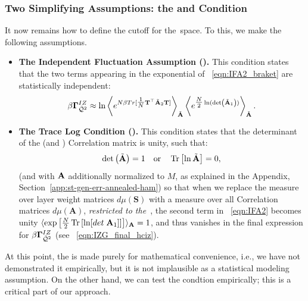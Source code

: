 \subsubsection{Two Simplifying Assumptions: the \IFA and \TRACELOG Condition}
\label{sxn:matgen_quality_hciz_C}

It now remains how to define the cutoff for the~\ECS space. To this, we make the following assumptions.
\begin{itemize}
\item
\textbf{The Independent Fluctuation Assumption (\IFA).}
This condition states that the two terms appearing in the exponential of \EQN~\ref{eqn:IFA2_braket} are statistically independent:
\begin{align}
  \label{eqn:IFA2}
  \beta\mathbf{\Gamma}^{IZ}_{\bar{\mathcal{Q}}^{2}} \approx \ln
  \left\langle
  e^{N\beta Tr[ \tfrac{1}{N}{\mathbf{T}}^{\top}\tilde{\mathbf{A}}_{2}{\mathbf{T}}] }
  \right\rangle_{\tilde{\mathbf{A}}}
  \left\langle
  e^{\tfrac{N}{2}\ln(\mbox{}{\text{det}}\left(\tilde{\mathbf{A}}_{1}\right))}
    \right\rangle_{\tilde{\mathbf{A}}}.
\end{align}

\item
\textbf{The Trace Log Condition (\TRACELOG).}
This condition states that the determinant of the \Student (and \Teacher) Correlation matrix is unity, such that:
\begin{align}
\label{eqn:tlc_mm}
\mbox{}{\text{det}}\left(\tilde{\mathbf{A}}\right)=1 
\quad\mbox{or}\quad
\mbox{}\operatorname{Tr}\left[\ln \tilde{\mathbf{A}}\right]=0  ,
\end{align}
(and with $\mathbf{A}$ additionally normalized to $M$, as explained in the Appendix, Section~\ref{app:st-gen-err-annealed-ham})
so that when we replace the measure over \Student layer weight matrices $d\mu(\mathbf{S})$ with a measure over all \Student Correlation matrices $d\mu(\mathbf{A})$,
\emph{restricted to the~\ECS}, the second term in \EQN~\ref{eqn:IFA2} becomes unity
$\langle \exp\left[\tfrac{N}{2} \mbox{}\operatorname{Tr}\left[ \ln[det\;\mathbf{A}_{1}] \right] \right]\rangle_{\mathbf{A}}=1$,
and thus vanishes in the final expression for $\beta\mathbf{\Gamma}^{IZ}_{\bar{\mathcal{Q}}^{2}}$ (see \EQN~\ref{eqn:IZG_final_hciz}).

\end{itemize}

\noindent
At this point, the \IFA is made purely for mathematical convenience, i.e., 
we have not demonstrated it empirically, but it is not implausible as a statistical modeling assumption. 
On the other hand, we can test the \TRACELOG condtion empirically;
this is a critical part of our \SETOL approach.


